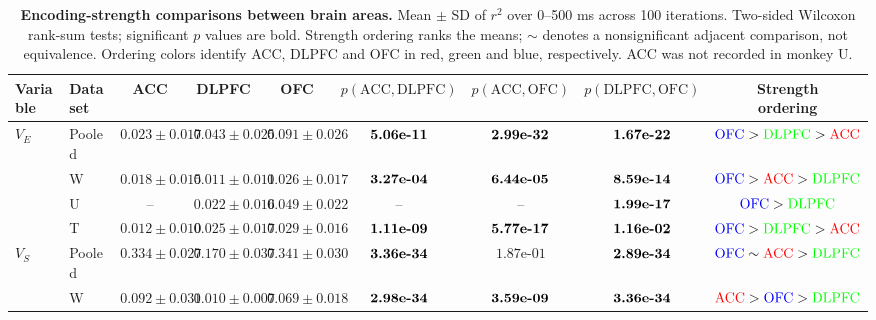 \documentclass[pdflatex,sn-mathphys-num]{sn-jnl}%
\begin{document}
\begin{table}[p]
\caption{\textbf{Encoding-strength comparisons between brain areas.} Mean $\pm$ SD of $r^2$ over 0--500 ms across 100 iterations. Two-sided Wilcoxon rank-sum tests; significant $p$ values are bold. Strength ordering ranks the means; $\sim$ denotes a nonsignificant adjacent comparison, not equivalence. Ordering colors identify ACC, DLPFC and OFC in red, green and blue, respectively. ACC was not recorded in monkey U.}
\label{tab:supp_r2_by_variable}
\begingroup\fontsize{7}{8.5}\selectfont\setlength{\tabcolsep}{1.5pt}
\begin{tabular*}{\textwidth}{@{\extracolsep{\fill}}llccccccc@{}}\toprule
Variable & Dataset & ACC & DLPFC & OFC & $p(\mathrm{ACC},\mathrm{DLPFC})$ & $p(\mathrm{ACC},\mathrm{OFC})$ & $p(\mathrm{DLPFC},\mathrm{OFC})$ & \shortstack{Strength\\ordering} \\
\midrule
$V_E$ & Pooled & $0.023 \pm  0.017$ & $0.043 \pm  0.025$ & $0.091 \pm  0.026$ & $\text{\bfseries \mbox{5.06e-11}}$ & $\text{\bfseries \mbox{2.99e-32}}$ & $\text{\bfseries \mbox{1.67e-22}}$ & $\textcolor{blue}{\mathrm{OFC}} > \textcolor{green}{\mathrm{DLPFC}} > \textcolor{red}{\mathrm{ACC}}$ \\
  & W & $0.018 \pm  0.015$ & $0.011 \pm  0.011$ & $0.026 \pm  0.017$ & $\text{\bfseries \mbox{3.27e-04}}$ & $\text{\bfseries \mbox{6.44e-05}}$ & $\text{\bfseries \mbox{8.59e-14}}$ & $\textcolor{blue}{\mathrm{OFC}} > \textcolor{red}{\mathrm{ACC}} > \textcolor{green}{\mathrm{DLPFC}}$ \\
  & U & -- & $0.022 \pm  0.016$ & $0.049 \pm  0.022$ & -- & -- & $\text{\bfseries \mbox{1.99e-17}}$ & $\textcolor{blue}{\mathrm{OFC}} > \textcolor{green}{\mathrm{DLPFC}}$ \\
  & T & $0.012 \pm  0.010$ & $0.025 \pm  0.017$ & $0.029 \pm  0.016$ & $\text{\bfseries \mbox{1.11e-09}}$ & $\text{\bfseries \mbox{5.77e-17}}$ & $\text{\bfseries \mbox{1.16e-02}}$ & $\textcolor{blue}{\mathrm{OFC}} > \textcolor{green}{\mathrm{DLPFC}} > \textcolor{red}{\mathrm{ACC}}$ \\
\midrule
$V_S$ & Pooled & $0.334 \pm  0.027$ & $0.170 \pm  0.037$ & $0.341 \pm  0.030$ & $\text{\bfseries \mbox{3.36e-34}}$ & $\mbox{1.87e-01}$ & $\text{\bfseries \mbox{2.89e-34}}$ & $\textcolor{blue}{\mathrm{OFC}} \sim \textcolor{red}{\mathrm{ACC}} > \textcolor{green}{\mathrm{DLPFC}}$ \\
  & W & $0.092 \pm  0.031$ & $0.010 \pm  0.007$ & $0.069 \pm  0.018$ & $\text{\bfseries \mbox{2.98e-34}}$ & $\text{\bfseries \mbox{3.59e-09}}$ & $\text{\bfseries \mbox{3.36e-34}}$ & $\textcolor{red}{\mathrm{ACC}} > \textcolor{blue}{\mathrm{OFC}} > \textcolor{green}{\mathrm{DLPFC}}$ \\

\end{tabular*}
\end{table}
\end{document}
